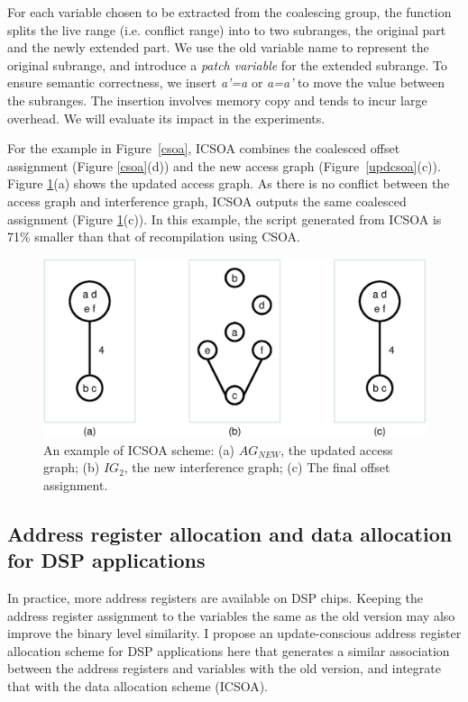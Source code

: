 For each variable chosen to be extracted from the coalescing group, the function splits the live range (i.e. conflict range) into to two subranges, the original part and the newly extended part. We use the old variable name to represent the original subrange, and introduce a {\em patch variable} for the extended subrange. To ensure semantic correctness, we insert {\it a'=a} or {\it a=a'} to move the value between the subranges. The insertion involves memory copy and tends to incur large overhead. We will evaluate its impact in the experiments.
 
For the example in Figure~\ref{csoa}, ICSOA combines the coalesced offset assignment (Figure \ref{csoa}(d)) and the new access graph (Figure~\ref{updcsoa}(c)). Figure \ref{icsoa}(a) shows the updated access graph. As there is no conflict between the access graph and interference graph, ICSOA outputs the same coalesced assignment (Figure \ref{icsoa}(c)). In this example, the script generated from ICSOA is 71\% smaller than that of recompilation using CSOA.

\begin{figure}[htbp]
\begin{center}
\includegraphics[scale=0.5]{./figures/icsoa.eps}
\caption[An example of ICSOA scheme.]{An example of ICSOA scheme:
(a) $\textit{AG}_\textit{NEW}$, the updated access graph;
(b) $\textit{IG}_2$, the new interference graph;
(c) The final offset assignment.}
\label{icsoa}
\end{center}
\vspace{-0.15in}
\end{figure}

\subsection{Address register allocation and data allocation for DSP applications}
In practice, more address registers are available on DSP chips. Keeping the address register assignment to the variables the same as the old version may also improve the binary level similarity.
I propose an update-conscious address register allocation scheme for DSP applications here that generates a similar association between the address registers and variables
with the old version, and integrate that with the data allocation scheme (ICSOA).

